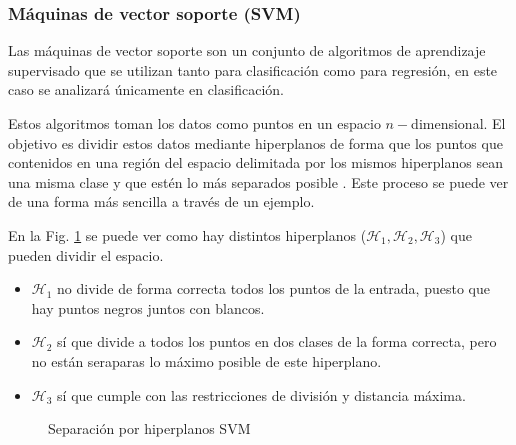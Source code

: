 \subsubsection{Máquinas de vector soporte (SVM)}

Las máquinas de vector soporte son un conjunto de algoritmos de aprendizaje supervisado que se utilizan tanto para clasificación como para regresión, en este caso se analizará únicamente en clasificación.

Estos algoritmos toman los datos como puntos en un espacio $n-$dimensional. El objetivo es dividir estos datos mediante hiperplanos de forma que los puntos que contenidos en una región del espacio delimitada por los mismos hiperplanos sean una misma clase y que estén lo más separados posible \cite{cervantes2020comprehensive}. Este proceso se puede ver de una forma más sencilla a través de un ejemplo.

En la Fig. \ref{fig:svm_separation} se puede ver como hay distintos hiperplanos ($\mathcal{H}_1, \mathcal{H}_2, \mathcal{H}_3$) que pueden dividir el espacio. 

\begin{itemize}
    \item $\mathcal{H}_1$ no divide de forma correcta todos los puntos de la entrada, puesto que hay puntos negros juntos con blancos.
    \item $\mathcal{H}_2$ sí que divide a todos los puntos en dos clases de la forma correcta, pero no están seraparas lo máximo posible de este hiperplano.
    \item $\mathcal{H}_3$ sí que cumple con las restricciones de división y distancia máxima.
\end{itemize}

\begin{figure}[htpb!]
    \centering
    \caption{Separación por hiperplanos SVM \cite{svmseparation2012}}
    \label{fig:svm_separation}
\end{figure}


